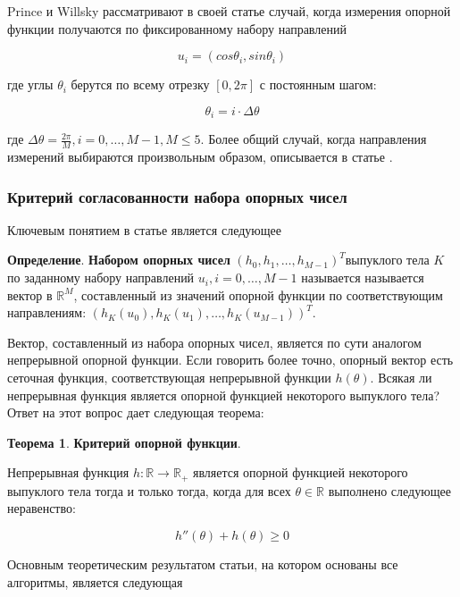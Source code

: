 \documentclass[a4paper,12pt, titlepage]{article}
\begin{document}
Prince и Willsky рассматривают в своей статье случай, когда измерения опорной
функции получаются по фиксированному набору направлений

$$u_{i} = (cos \theta_{i}, sin \theta_{i})$$

где углы $\theta_{i}$ берутся по всему отрезку $[0, 2 \pi]$ с постоянным шагом:

$$\theta_{i} = i \cdot \Delta \theta$$

где $\Delta \theta = \frac{2 \pi}{M}, i = 0, \ldots, M - 1, M \leq 5$. Более
общий случай, когда направления измерений выбираются произвольным образом,
описывается в статье
\cite[Lele - Kulkarni - Willsky (1992)]{journals/josaa/LeleKW92}.

\subsubsection{Критерий согласованности набора опорных чисел}

Ключевым понятием в статье является следующее

\begin{flushleft}
 \textbf{Определение}. \textbf{Набором опорных чисел}
 $(h_{0}, h_{1}, \ldots, h_{M - 1})^{T}$выпуклого тела $K$ по заданному набору
 направлений $u_{i}, i = 0, \ldots, M - 1$ называется называется вектор в
 $\mathbb{R}^{M}$, составленный из значений опорной функции по соответствующим
 направлениям: $(h_{K}(u_{0}), h_{K}(u_{1}), \ldots, h_{K}(u_{M - 1}))^{T}$.
\end{flushleft}

Вектор, составленный из набора опорных чисел, является по сути аналогом
непрерывной опорной функции. Если говорить более точно, опорный вектор есть
сеточная функция, соответствующая непрерывной функции $h(\theta)$. Всякая ли
непрерывная функция является опорной функцией некоторого выпуклого тела? Ответ
на этот вопрос дает следующая теорема:

\begin{flushleft}
 \textbf{Теорема 1}. \textbf{Критерий опорной функции}.
 
 Непрерывная функция $h : \mathbb{R} \to \mathbb{R}_{+}$ является опорной
 функцией некоторого выпуклого тела тогда и только тогда, когда для всех
 $\theta \in \mathbb{R}$ выполнено следующее неравенство:
 
 $$
 h''(\theta) + h(\theta) \geq 0
 $$
\end{flushleft}


Основным теоретическим результатом статьи, на котором основаны все алгоритмы,
является следующая
\end{document}
